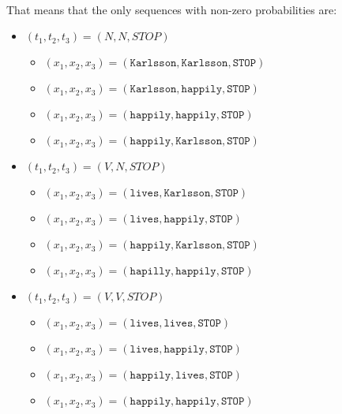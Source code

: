 \documentclass{article}
\begin{document}
\paragraph{} That means that the only sequences with non-zero probabilities are:

\begin{itemize}
    \item $(t_1, t_2, t_3) = (N, N, STOP)$
        \begin{itemize}
            \item $(x_1, x_2, x_3) = (\texttt{Karlsson}, \texttt{Karlsson}, \texttt{STOP})$
            \item $(x_1, x_2, x_3) = (\texttt{Karlsson}, \texttt{happily}, \texttt{STOP})$
            \item $(x_1, x_2, x_3) = (\texttt{happily}, \texttt{happily}, \texttt{STOP})$
            \item $(x_1, x_2, x_3) = (\texttt{happily}, \texttt{Karlsson}, \texttt{STOP})$
        \end{itemize}
    \item $(t_1, t_2, t_3) = (V, N, STOP)$
        \begin{itemize}
            \item $(x_1, x_2, x_3) = (\texttt{lives}, \texttt{Karlsson}, \texttt{STOP})$
            \item $(x_1, x_2, x_3) = (\texttt{lives}, \texttt{happily}, \texttt{STOP})$
            \item $(x_1, x_2, x_3) = (\texttt{happily}, \texttt{Karlsson}, \texttt{STOP})$
            \item $(x_1, x_2, x_3) = (\texttt{hapilly}, \texttt{happily}, \texttt{STOP})$
        \end{itemize}
    \item $(t_1, t_2, t_3) = (V, V, STOP)$
        \begin{itemize}
            \item $(x_1, x_2, x_3) = (\texttt{lives}, \texttt{lives}, \texttt{STOP})$
            \item $(x_1, x_2, x_3) = (\texttt{lives}, \texttt{happily}, \texttt{STOP})$
            \item $(x_1, x_2, x_3) = (\texttt{happily}, \texttt{lives}, \texttt{STOP})$
            \item $(x_1, x_2, x_3) = (\texttt{happily}, \texttt{happily}, \texttt{STOP})$
        \end{itemize}
\end{itemize}
\end{document}
